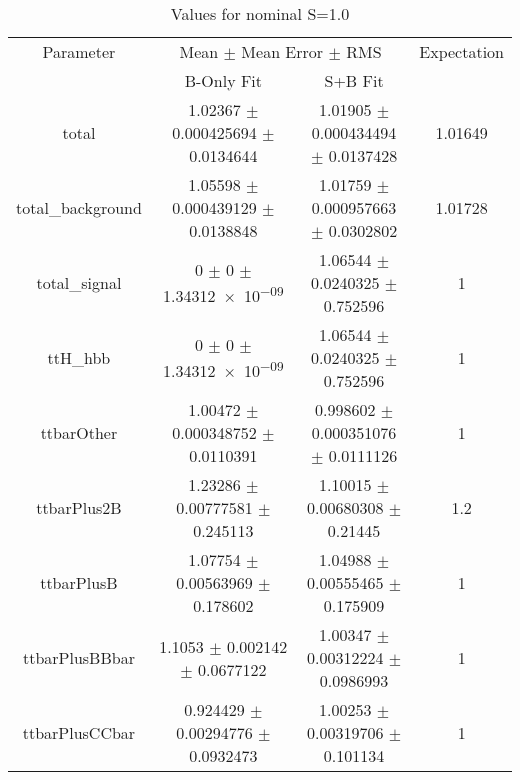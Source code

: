 \begin{table}
\centering
\caption{Values for nominal S=1.0}
\begin{tabular}{cccc}
\toprule
Parameter & \multicolumn{2}{c}{Mean $\pm$ Mean Error $\pm$ RMS} & Expectation\\
 & B-Only Fit & S+B Fit & \\
\midrule
total & \num{1.02367} $\pm$ \num{0.000425694} $\pm$ \num{0.0134644} & \num{1.01905} $\pm$ \num{0.000434494} $\pm$ \num{0.0137428} & \num{1.01649}\\
total\_background & \num{1.05598} $\pm$ \num{0.000439129} $\pm$ \num{0.0138848} & \num{1.01759} $\pm$ \num{0.000957663} $\pm$ \num{0.0302802} & \num{1.01728}\\
total\_signal & \num{0} $\pm$ \num{0} $\pm$ \num{1.34312e-09} & \num{1.06544} $\pm$ \num{0.0240325} $\pm$ \num{0.752596} & \num{1}\\
ttH\_hbb & \num{0} $\pm$ \num{0} $\pm$ \num{1.34312e-09} & \num{1.06544} $\pm$ \num{0.0240325} $\pm$ \num{0.752596} & \num{1}\\
ttbarOther & \num{1.00472} $\pm$ \num{0.000348752} $\pm$ \num{0.0110391} & \num{0.998602} $\pm$ \num{0.000351076} $\pm$ \num{0.0111126} & \num{1}\\
ttbarPlus2B & \num{1.23286} $\pm$ \num{0.00777581} $\pm$ \num{0.245113} & \num{1.10015} $\pm$ \num{0.00680308} $\pm$ \num{0.21445} & \num{1.2}\\
ttbarPlusB & \num{1.07754} $\pm$ \num{0.00563969} $\pm$ \num{0.178602} & \num{1.04988} $\pm$ \num{0.00555465} $\pm$ \num{0.175909} & \num{1}\\
ttbarPlusBBbar & \num{1.1053} $\pm$ \num{0.002142} $\pm$ \num{0.0677122} & \num{1.00347} $\pm$ \num{0.00312224} $\pm$ \num{0.0986993} & \num{1}\\
ttbarPlusCCbar & \num{0.924429} $\pm$ \num{0.00294776} $\pm$ \num{0.0932473} & \num{1.00253} $\pm$ \num{0.00319706} $\pm$ \num{0.101134} & \num{1}\\
\bottomrule
\end{tabular}
\end{table}